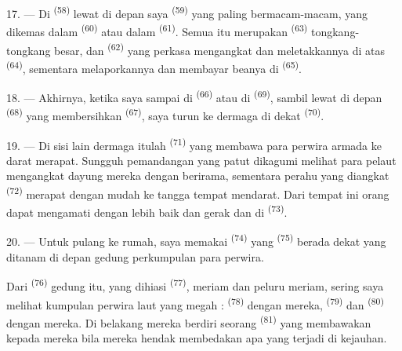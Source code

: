 17. --- Di  \textsuperscript{(58)} lewat di depan saya
 \textsuperscript{(59)} yang paling
bermacam-macam, yang dikemas dalam  \textsuperscript{(60)}
atau dalam  \textsuperscript{(61)}. Semua itu merupakan
 \textsuperscript{(63)} tongkang-tongkang besar, dan
 \textsuperscript{(62)} yang perkasa mengangkat dan
meletakkannya di atas  \textsuperscript{(64)}, sementara
 melaporkannya dan membayar beanya di
 \textsuperscript{(65)}.

18. --- Akhirnya, ketika saya sampai di 
\textsuperscript{(66)} atau di  \textsuperscript{(69)},
sambil lewat di depan  \textsuperscript{(68)} yang
membersihkan  \textsuperscript{(67)}, saya turun ke
dermaga di dekat  \textsuperscript{(70)}.

19. --- Di sisi lain dermaga itulah 
\textsuperscript{(71)} yang membawa para perwira armada ke darat
merapat. Sungguh pemandangan yang patut dikagumi melihat para pelaut
mengangkat dayung mereka dengan berirama, sementara perahu yang
diangkat  \textsuperscript{(72)} merapat dengan mudah ke
tangga tempat mendarat. Dari tempat ini orang dapat mengamati dengan
lebih baik  dan gerak  dan
 di  \textsuperscript{(73)}.

\VUsaut{3.0mm}
\VUsaut{3.0mm}

20. --- Untuk pulang ke rumah, saya memakai 
\textsuperscript{(74)} yang  \textsuperscript{(75)}
berada dekat  yang ditanam di depan gedung perkumpulan
para perwira.

Dari  \textsuperscript{(76)} gedung itu, yang dihiasi
 \textsuperscript{(77)}, meriam dan peluru meriam,
sering saya melihat kumpulan perwira laut yang megah :
 \textsuperscript{(78)} dengan 
mereka,  \textsuperscript{(79)} dan
 \textsuperscript{(80)} dengan  mereka. Di belakang mereka berdiri seorang 
\textsuperscript{(81)} yang membawakan  kepada mereka
bila mereka hendak membedakan apa yang terjadi di kejauhan.

